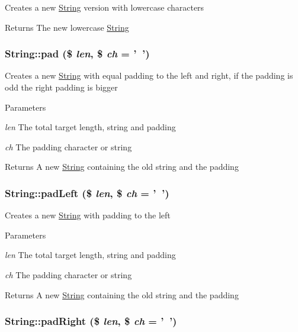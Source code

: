 \label{classString_a70de74664e69b6e2fc93d231173df0d2}
Creates a new \hyperlink{classString}{String} version with lowercase characters \begin{DoxyReturn}{Returns}
The new lowercase \hyperlink{classString}{String} 
\end{DoxyReturn}
\hypertarget{classString_aa8542443a25479d810d0c580680f685d}{
\subsubsection[{pad}]{\setlength{\rightskip}{0pt plus 5cm}String::pad (\$ {\em len}, \/  \$ {\em ch} = {\ttfamily '~'})}}
\label{classString_aa8542443a25479d810d0c580680f685d}
Creates a new \hyperlink{classString}{String} with equal padding to the left and right, if the padding is odd the right padding is bigger 
\begin{DoxyParams}{Parameters}
\item[{\em len}]The total target length, string and padding \item[{\em ch}]The padding character or string \end{DoxyParams}
\begin{DoxyReturn}{Returns}
A new \hyperlink{classString}{String} containing the old string and the padding 
\end{DoxyReturn}
\hypertarget{classString_ae39386e13e0e87cff555bfaea20ce656}{
\subsubsection[{padLeft}]{\setlength{\rightskip}{0pt plus 5cm}String::padLeft (\$ {\em len}, \/  \$ {\em ch} = {\ttfamily '~'})}}
\label{classString_ae39386e13e0e87cff555bfaea20ce656}
Creates a new \hyperlink{classString}{String} with padding to the left 
\begin{DoxyParams}{Parameters}
\item[{\em len}]The total target length, string and padding \item[{\em ch}]The padding character or string \end{DoxyParams}
\begin{DoxyReturn}{Returns}
A new \hyperlink{classString}{String} containing the old string and the padding 
\end{DoxyReturn}
\hypertarget{classString_a8ab0df0a7bbe4d99b84356403abf946f}{
\subsubsection[{padRight}]{\setlength{\rightskip}{0pt plus 5cm}String::padRight (\$ {\em len}, \/  \$ {\em ch} = {\ttfamily '~'})}}
